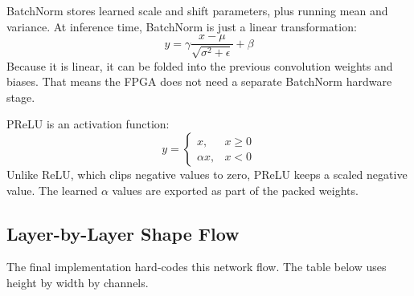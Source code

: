 \documentclass[11pt]{article}
\begin{document}
BatchNorm stores learned scale and shift parameters, plus running mean and variance.
At inference time, BatchNorm is just a linear transformation:
\[
  y = \gamma \frac{x - \mu}{\sqrt{\sigma^2 + \epsilon}} + \beta
\]
Because it is linear, it can be folded into the previous convolution weights and biases.
That means the FPGA does not need a separate BatchNorm hardware stage.

PReLU is an activation function:
\[
  y =
  \begin{cases}
    x, & x \ge 0 \\
    \alpha x, & x < 0
  \end{cases}
\]
Unlike ReLU, which clips negative values to zero, PReLU keeps a scaled negative value.
The learned \(\alpha\) values are exported as part of the packed weights.

\subsection{Layer-by-Layer Shape Flow}

The final implementation hard-codes this network flow.
The table below uses height by width by channels.
\end{document}
